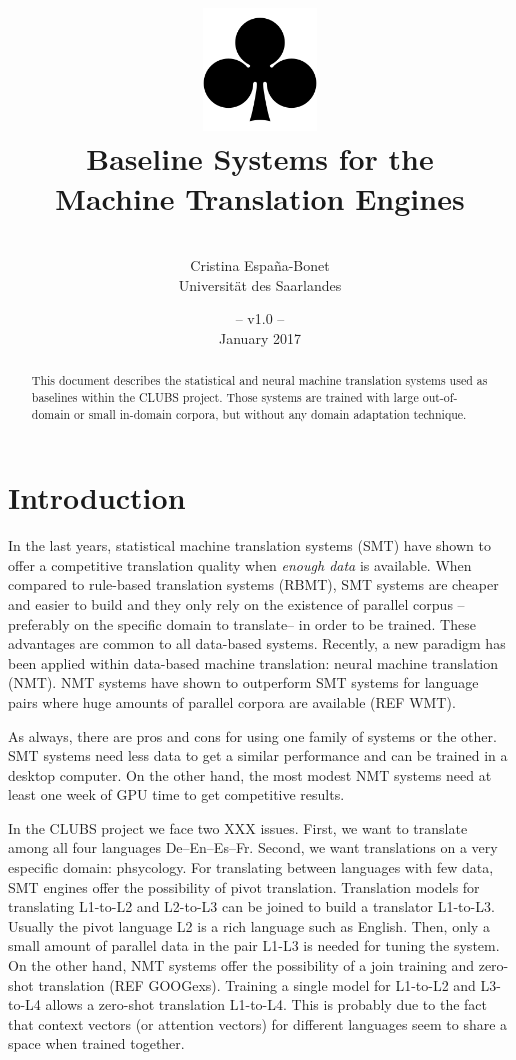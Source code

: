 \documentclass[a4paper,11pt]{article}
\title{
\includegraphics[width=3cm]{./img/200px-SuitClubs.png} \\
\Huge Baseline Systems for the \\ Machine Translation Engines \\ 
}
\author{\vspace*{1cm}\\ \LARGE Cristina Espa\~na-Bonet \medskip \\ \Large Universit\"at des Saarlandes}
\date{\vspace*{2cm} -- v1.0 --\\January 2017}
\begin{document}
\clearpage\maketitle
\thispagestyle{empty}

\vspace*{5cm}
\begin{abstract}
This document describes the statistical and neural machine translation systems used as baselines within the CLUBS project. Those systems are trained with
large out-of-domain or small in-domain corpora, but without any domain adaptation technique. 
\end{abstract}

\newpage
\tableofcontents
\clearpage


\section{Introduction}
\label{s:intro}

In the last years, statistical machine translation systems (SMT) have shown to offer a competitive translation quality when \emph{enough data} is available. When compared to rule-based translation systems (RBMT), SMT systems are cheaper and easier to build and they only rely on the existence of parallel corpus --preferably on the specific domain to translate-- in order to be trained. These advantages are common to all data-based systems. Recently, a new paradigm has been applied within data-based machine translation: neural machine translation (NMT). NMT systems have shown to outperform SMT systems for language pairs where huge amounts of parallel corpora are available (REF WMT).

As always, there are pros and cons for using one family of systems or the other. SMT systems need less data to get a similar performance and can be trained in a desktop computer. On the other hand, the most modest NMT systems need at least one week of GPU time to get competitive results.

In the CLUBS project we face two XXX issues. First, we want to translate among all four languages De--En--Es--Fr. Second, we want translations on a very especific domain: phsycology. For translating between languages with few data, SMT engines offer the possibility of pivot translation. Translation models for translating L1-to-L2 and L2-to-L3 can be joined to build a translator L1-to-L3. Usually the pivot language L2 is a rich language such as English. Then, only a small amount of parallel data in the pair L1-L3 is needed for tuning the system. On the other hand, NMT systems offer the possibility of a join training and zero-shot translation (REF GOOGexs). Training a single model for L1-to-L2 and L3-to-L4 allows a zero-shot translation L1-to-L4. This is probably due to the fact that context vectors (or attention vectors) for different languages seem to share a space when trained together.
\end{document}
